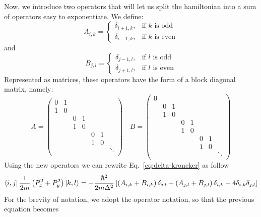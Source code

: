 Now, we introduce two operators that will let us split the hamiltonian into a sum of operators easy to exponentiate. We define:
\begin{equation}
A_{i,k} = \begin{cases} \delta_{i+1,k}, & \mbox{if } k\mbox{ is odd} \\ \delta_{i-1,k}, & \mbox{if } k\mbox{ is even} \end{cases}
\end{equation}
and
\begin{equation} 
B_{j,l} = \begin{cases} \delta_{j-1,l}, & \mbox{if } l\mbox{ is odd} \\ \delta_{j+1,l}, & \mbox{if } l\mbox{ is even} \end{cases}
\end{equation}
Represented as matrices, these operators have the form of a block diagonal matrix, namely:
\begin{equation}
A = \begin{pmatrix}
0 & 1 \\
1 & 0 \\
 & & 0 & 1 \\
 & & 1 & 0 \\
 & & & & 0 & 1 \\
 & & & & 1 & 0 \\
 & & & &  & & \ddots \\
\end{pmatrix}
\quad B = \begin{pmatrix}
0 \\
& 0 & 1 \\
& 1 & 0 \\
& & & 0 & 1 \\
& & & 1 & 0 \\
& & & & & 0 & 1 \\
& & & & & 1 & 0 \\
& & & & &  & & \ddots \\
\end{pmatrix}
\end{equation}
Using the new operators we can rewrite Eq.~\eqref{eq:delta-kroneker} as follow
\begin{equation}
\bra{i,j} \frac{1}{2m} \left( P_x^2 + P_y^2 \right) \ket{k,l} = -\frac{\hbar^2}{2m\Delta^2} \left[ \left( A_{i,k} + B_{i,k} \right) \delta_{j,l} + \left( A_{j,l} + B_{j,l} \right) \delta_{i,k} - 4 \delta_{i,k} \delta_{j,l} \right]
\end{equation}
For the brevity of notation, we adopt the operator notation, so that the previous equation becomes

